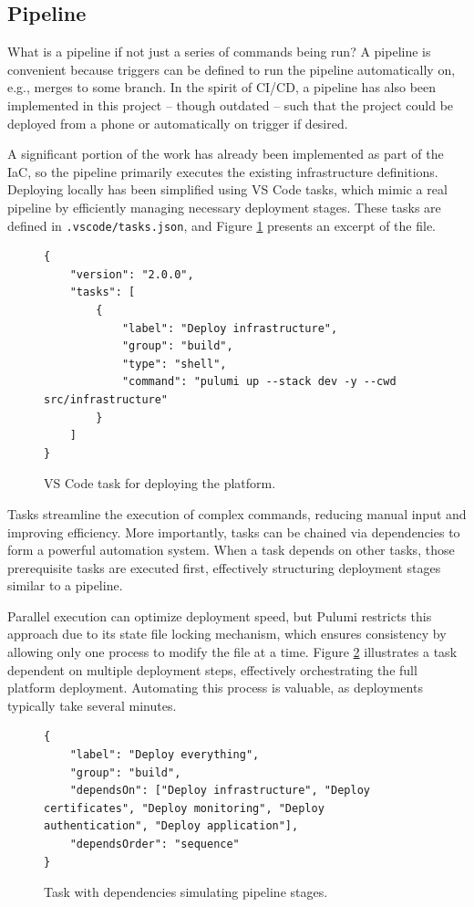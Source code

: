 \subsection{Pipeline}
What is a pipeline if not just a series of commands being run? A pipeline is convenient because triggers can be defined to run the pipeline automatically on, e.g., merges to some branch. In the spirit of CI/CD, a pipeline has also been implemented in this project -- though outdated -- such that the project could be deployed from a phone or automatically on trigger if desired.

A significant portion of the work has already been implemented as part of the IaC, so the pipeline primarily executes the existing infrastructure definitions. Deploying locally has been simplified using VS Code tasks, which mimic a real pipeline by efficiently managing necessary deployment stages. These tasks are defined in \texttt{.vscode/tasks.json}, and Figure \ref{fig:vscode_tasks} presents an excerpt of the file.

\begin{figure}[h]
\begin{verbatim}
{
    "version": "2.0.0",
    "tasks": [
        {
            "label": "Deploy infrastructure",
            "group": "build",
            "type": "shell",
            "command": "pulumi up --stack dev -y --cwd src/infrastructure"
        }
    ]
}
\end{verbatim}
    \caption{VS Code task for deploying the platform.}
    \label{fig:vscode_tasks}
\end{figure}

Tasks streamline the execution of complex commands, reducing manual input and improving efficiency. More importantly, tasks can be chained via dependencies to form a powerful automation system. When a task depends on other tasks, those prerequisite tasks are executed first, effectively structuring deployment stages similar to a pipeline.

Parallel execution can optimize deployment speed, but Pulumi restricts this approach due to its state file locking mechanism, which ensures consistency by allowing only one process to modify the file at a time. Figure \ref{fig:vscode_tasks_deps} illustrates a task dependent on multiple deployment steps, effectively orchestrating the full platform deployment. Automating this process is valuable, as deployments typically take several minutes.

\begin{figure}[h]
\begin{verbatim}
{
    "label": "Deploy everything",
    "group": "build",
    "dependsOn": ["Deploy infrastructure", "Deploy certificates", "Deploy monitoring", "Deploy authentication", "Deploy application"],
    "dependsOrder": "sequence"
}
\end{verbatim}
\caption{Task with dependencies simulating pipeline stages.}
\label{fig:vscode_tasks_deps}
\end{figure}

